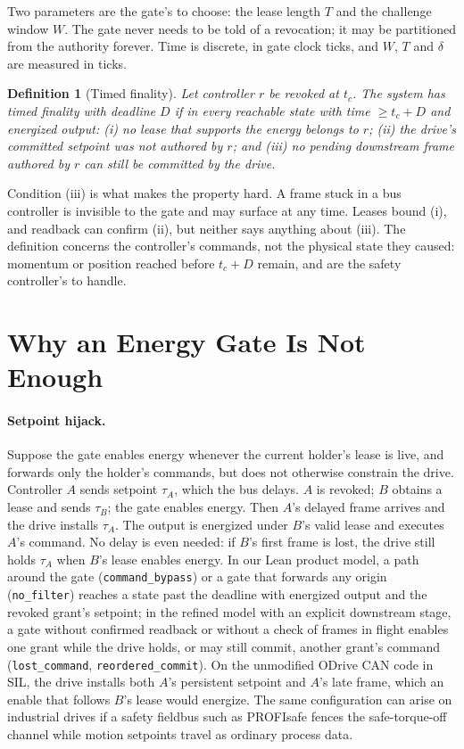 \documentclass[letterpaper]{article} %
\newcommand{\code}[1]{\texttt{#1}}
\newtheorem{definition}{Definition}
\begin{document}
Two parameters are the gate's to choose: the lease length $T$ and the challenge window $W$. The
gate never needs to be told of a revocation; it may be partitioned from the authority forever.
Time is discrete, in gate clock ticks, and $W$, $T$ and $\delta$ are measured in ticks.

\begin{definition}[Timed finality]
Let controller $r$ be revoked at $t_c$. The system has \emph{timed finality with deadline $D$} if
in every reachable state with time $\ge t_c + D$ and energized output: (i) no lease that supports
the energy belongs to $r$; (ii) the drive's committed setpoint was not authored by $r$; and (iii)
no pending downstream frame authored by $r$ can still be committed by the drive.
\end{definition}

Condition (iii) is what makes the property hard. A frame stuck in a bus controller is invisible to
the gate and may surface at any time. Leases bound (i), and readback can confirm (ii), but neither
says anything about (iii). The definition concerns the controller's commands, not the physical
state they caused: momentum or position reached before $t_c+D$ remain, and are the safety
controller's to handle.

\section{Why an Energy Gate Is Not Enough}
\label{sec:hijack}

\paragraph{Setpoint hijack.} Suppose the gate enables energy whenever the current holder's lease
is live, and forwards only the holder's commands, but does not otherwise constrain the drive.
Controller $A$ sends setpoint $\tau_A$, which the bus delays. $A$ is revoked; $B$ obtains a lease
and sends $\tau_B$; the gate enables energy. Then $A$'s delayed frame arrives and the drive
installs $\tau_A$. The output is energized under $B$'s valid lease and executes $A$'s command.
No delay is even needed: if $B$'s first frame is lost, the drive still holds $\tau_A$ when $B$'s
lease enables energy. In our Lean product model, a path around the gate (\code{command\_bypass}) or a
gate that forwards any origin (\code{no\_filter}) reaches a state past the deadline with
energized output and the revoked grant's setpoint; in the refined model with an explicit
downstream stage, a gate without confirmed readback or without a check of frames in flight
enables one grant while the drive holds, or may still commit, another grant's command
(\code{lost\_command}, \code{reordered\_commit}). On the unmodified ODrive CAN code in SIL, the
drive installs both $A$'s persistent setpoint and $A$'s late frame, which an enable that follows
$B$'s lease would energize. The same configuration can arise on industrial drives if a safety
fieldbus such as PROFIsafe \citep{iec61784} fences the safe-torque-off channel while motion
setpoints travel as ordinary process data.
\end{document}
